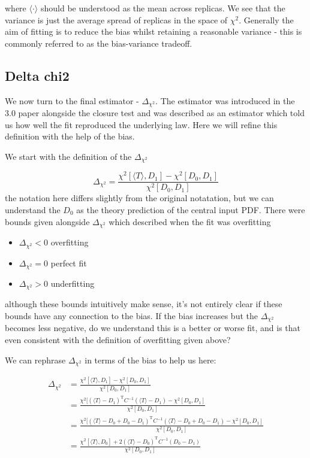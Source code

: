 \documentclass[a4paper]{article}
\newcommand{\dcs}{ \Delta_{\chi^{2}} }
\newcommand{\chis}{ \chi^{2} }
\newcommand{\thc}{\langle T \rangle}
\newcommand{\T}[1]{{#1}^{\mathrm{T}}}
\begin{document}
where $\langle \cdot \rangle$ should be understood as the mean across replicas. We see
that the variance is just the average spread of replicas in the space of $\chis$.
Generally the aim of fitting is to reduce the bias whilst retaining a reasonable
variance - this is commonly referred to as the bias-variance tradeoff.

\subsection*{Delta chi2}

We now turn to the final estimator - $\dcs$. The estimator was introduced in the
3.0 paper alongside the closure test and was described as an estimator which told
us how well the fit reproduced the underlying law. Here we will refine this definition
with the help of the bias.

We start with the definition of the $\dcs$

\begin{equation}
    \dcs = \frac{\chis[\thc, D_{1}] - \chis[D_{0}, D_{1}]}{\chis[D_{0}, D_{1}]}
\end{equation}
the notation here differs slightly from the original notatation, but we can understand
the $D_{0}$ as the theory prediction of the central input PDF. There were bounds given alongside
$\dcs$ which described when the fit was overfitting

\begin{itemize}
    \item $\dcs < 0$ overfitting
    \item $\dcs = 0$ perfect fit
    \item $\dcs > 0$ underfitting 
\end{itemize}

although these bounds intuitively make sense, it's not entirely clear if these
bounds have any connection to the bias. If the bias increases but the $\dcs$ becomes
less negative, do we understand this is a better or worse fit, and is that even consistent
with the definition of overfitting given above?

We can rephrase $\dcs$ in terms of the bias to help us here:

\begin{equation}
    \begin{split}
        \dcs &= \frac{\chis[\thc, D_{1}] - \chis[D_{0}, D_{1}]}{\chis[D_{0}, D_{1}]} \\
        &= \frac{\chis[\T{(\thc - D_{1})} C^{-1} (\thc - D_{1}) - \chis[D_{0}, D_{1}]}{\chis[D_{0}, D_{1}]} \\
        &= \frac{\chis[\T{(\thc - D_{0} + D_{0} - D_{1})} C^{-1} (\thc - D_{0} + D_{0} -D_{1}) - \chis[D_{0}, D_{1}]}{\chis[D_{0}, D_{1}]} \\
        &= \frac{ \chis[\thc, D_{0}] + 2 \T{(\thc - D_{0})} C^{-1} (D_{0} - D_{1}) }{\chis[D_{0}, D_{1}]}
    \end{split}
    \label{eq: deltachi2tobias}
\end{equation}
\end{document}
